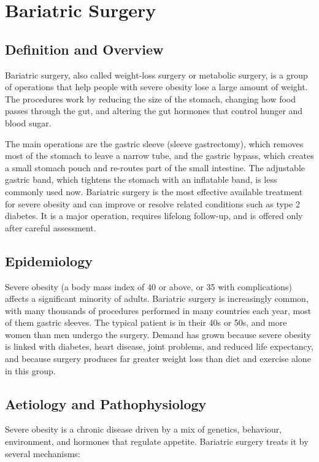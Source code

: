 \chapter{Bariatric Surgery}

\section*{Definition and Overview}
Bariatric surgery, also called weight-loss surgery or metabolic surgery, is a group of operations that help people with severe obesity lose a large amount of weight. The procedures work by reducing the size of the stomach, changing how food passes through the gut, and altering the gut hormones that control hunger and blood sugar.

The main operations are the gastric sleeve (sleeve gastrectomy), which removes most of the stomach to leave a narrow tube, and the gastric bypass, which creates a small stomach pouch and re-routes part of the small intestine. The adjustable gastric band, which tightens the stomach with an inflatable band, is less commonly used now. Bariatric surgery is the most effective available treatment for severe obesity and can improve or resolve related conditions such as type 2 diabetes. It is a major operation, requires lifelong follow-up, and is offered only after careful assessment.

\section*{Epidemiology}
Severe obesity (a body mass index of 40 or above, or 35 with complications) affects a significant minority of adults. Bariatric surgery is increasingly common, with many thousands of procedures performed in many countries each year, most of them gastric sleeves. The typical patient is in their 40s or 50s, and more women than men undergo the surgery. Demand has grown because severe obesity is linked with diabetes, heart disease, joint problems, and reduced life expectancy, and because surgery produces far greater weight loss than diet and exercise alone in this group.

\section*{Aetiology and Pathophysiology}
Severe obesity is a chronic disease driven by a mix of genetics, behaviour, environment, and hormones that regulate appetite. Bariatric surgery treats it by several mechanisms:

